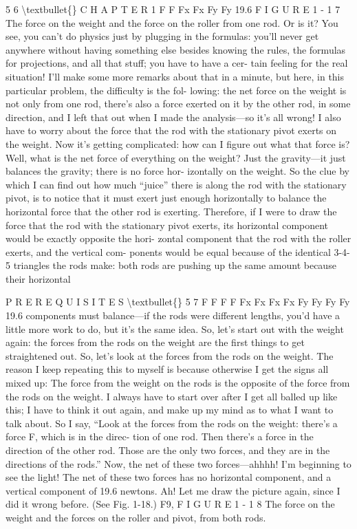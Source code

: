 \documentclass[10pt,oneside]{article}
\begin{document}
5 6 \textbackslash{}textbullet\{\} C H A P T E R  1 F F Fx Fx Fy Fy  19.6 F I G U R E 1 - 1 7 The force on the weight and the force on the roller from one rod. Or is it? You see, you can’t do physics just by plugging in the formulas: you’ll never get anywhere without having something else besides knowing the rules, the formulas for projections, and all that stuff; you have to have a cer- tain feeling for the real situation! I’ll make some more remarks about that in a minute, but here, in this particular problem, the difficulty is the fol- lowing: the net force on the weight is not only from one rod, there’s also a force exerted on it by the other rod, in some direction, and I left that out when I made the analysis---so it’s all wrong! I also have to worry about the force that the rod with the stationary pivot exerts on the weight. Now it’s getting complicated: how can I figure out what that force is? Well, what is the net force of everything on the weight? Just the gravity---it just balances the gravity; there is no force hor- izontally on the weight. So the clue by which I can find out how much “juice” there is along the rod with the stationary pivot, is to notice that it must exert just enough horizontally to balance the horizontal force that the other rod is exerting. Therefore, if I were to draw the force that the rod with the stationary pivot exerts, its horizontal component would be exactly opposite the hori- zontal component that the rod with the roller exerts, and the vertical com- ponents would be equal because of the identical 3-4-5 triangles the rods make: both rods are pushing up the same amount because their horizontal\par

P R E R E Q U I S I T E S \textbackslash{}textbullet\{\} 5 7 F F F F Fx Fx Fx Fx Fy Fy Fy  Fy  19.6 components must balance---if the rods were different lengths, you’d have a little more work to do, but it’s the same idea. So, let’s start out with the weight again: the forces from the rods on the weight are the first things to get straightened out. So, let’s look at the forces from the rods on the weight. The reason I keep repeating this to myself is because otherwise I get the signs all mixed up: The force from the weight on the rods is the opposite of the force from the rods on the weight. I always have to start over after I get all balled up like this; I have to think it out again, and make up my mind as to what I want to talk about. So I say, “Look at the forces from the rods on the weight: there’s a force F, which is in the direc- tion of one rod. Then there’s a force in the direction of the other rod. Those are the only two forces, and they are in the directions of the rods.” Now, the net of these two forces---ahhhh! I’m beginning to see the light! The net of these two forces has no horizontal component, and a vertical component of 19.6 newtons. Ah! Let me draw the picture again, since I did it wrong before. (See Fig. 1-18.) F9, F I G U R E 1 - 1 8 The force on the weight and the forces on the roller and pivot, from both rods.\par
\end{document}
